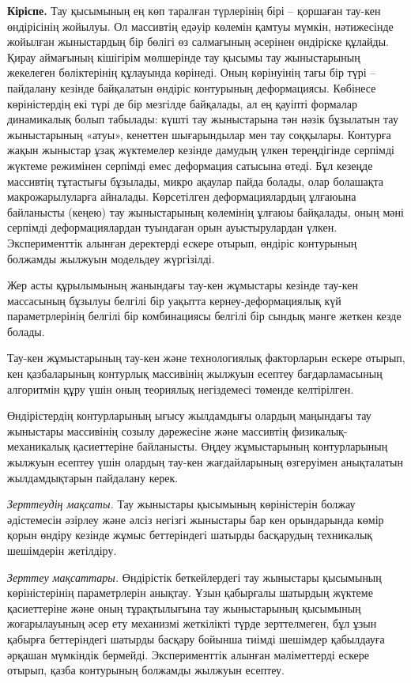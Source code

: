 \begin{multicols}{2}
{\bfseries Кіріспе.} Тау қысымының ең көп таралған түрлерінің бірі --
қоршаған тау-кен өндірісінің жойылуы. Ол массивтің едәуір көлемін қамтуы
мүмкін, нәтижесінде жойылған жыныстардың бір бөлігі өз салмағының
әсерінен өндіріске құлайды. Қирау аймағының кішігірім мөлшерінде тау
қысымы тау жыныстарының жекелеген бөліктерінің құлауында көрінеді. Оның
көрінуінің тағы бір түрі -- пайдалану кезінде байқалатын өндіріс
контурының деформациясы. Көбінесе көріністердің екі түрі де бір мезгілде
байқалады, ал ең қауіпті формалар динамикалық болып табылады: күшті тау
жыныстарына тән нәзік бұзылатын тау жыныстарының «атуы», кенеттен
шығарындылар мен тау соққылары. Контурға жақын жыныстар ұзақ жүктемелер
кезінде дамудың үлкен тереңдігінде серпімді жүктеме режимінен серпімді
емес деформация сатысына өтеді. Бұл кезеңде массивтің тұтастығы
бұзылады, микро ақаулар пайда болады, олар болашақта макрожарылуларға
айналады. Көрсетілген деформациялардың ұлғаюына байланысты (кеңею) тау
жыныстарының көлемінің ұлғаюы байқалады, оның мәні серпімді
деформациялардан туындаған орын ауыстырулардан үлкен. Эксперименттік
алынған деректерді ескере отырып, өндіріс контурының болжамды жылжуын
модельдеу жүргізілді.

Жер асты құрылымының жанындағы тау-кен жұмыстары кезінде тау-кен
массасының бұзылуы белгілі бір уақытта кернеу-деформациялық күй
параметрлерінің белгілі бір комбинациясы белгілі бір сындық мәнге жеткен
кезде болады.

Тау-кен жұмыстарының тау-кен және технологиялық факторларын ескере
отырып, кен қазбаларының контурлық массивінің жылжуын есептеу
бағдарламасының алгоритмін құру үшін оның теориялық негіздемесі төменде
келтірілген.

Өндірістердің контурларының ығысу жылдамдығы олардың маңындағы тау
жыныстары массивінің созылу дәрежесіне және массивтің
физикалық-механикалық қасиеттеріне байланысты. Өңдеу жұмыстарының
контурларының жылжуын есептеу үшін олардың тау-кен жағдайларының
өзгеруімен анықталатын жылдамдықтарын пайдалану керек.

\emph{Зерттеудің мақсаты.} Тау жыныстары қысымының көріністерін болжау
әдістемесін әзірлеу және әлсіз негізгі жыныстары бар кен орындарында
көмір қорын өндіру кезінде жұмыс беттеріндегі шатырды басқарудың
техникалық шешімдерін жетілдіру.

\emph{Зерттеу мақсаттары.} Өндірістік беткейлердегі тау жыныстары
қысымының көріністерінің параметрлерін анықтау. Ұзын қабырғалы шатырдың
жүктеме қасиеттеріне және оның тұрақтылығына тау жыныстарының қысымының
жоғарылауының әсер ету механизмі жеткілікті түрде зерттелмеген, бұл ұзын
қабырға беттеріндегі шатырды басқару бойынша тиімді шешімдер қабылдауға
әрқашан мүмкіндік бермейді. Эксперименттік алынған мәліметтерді ескере
отырып, қазба контурының болжамды жылжуын есептеу.


\end{multicols}
